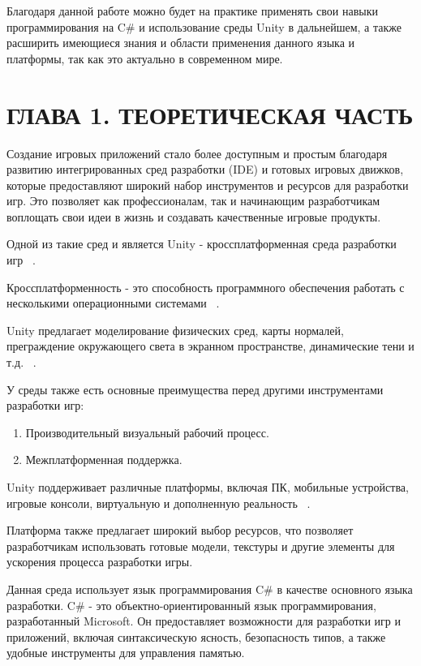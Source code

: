 \documentclass[14pt, oneside]{altsu-report}
\begin{document}
Благодаря данной работе можно будет на практике применять свои навыки программирования на C\# и использование среды Unity в дальнейшем, а также расширить имеющиеся знания и области применения данного языка и платформы, так как это актуально в современном мире.


\chapter{ГЛАВА 1. ТЕОРЕТИЧЕСКАЯ ЧАСТЬ} 

Создание игровых приложений стало более доступным и простым благодаря развитию интегрированных сред разработки (IDE) и готовых игровых движков, которые предоставляют широкий набор инструментов и ресурсов для разработки игр. Это позволяет как профессионалам, так и начинающим разработчикам воплощать свои идеи в жизнь и создавать качественные игровые продукты.

Одной из такие сред и является Unity - кроссплатформенная среда разработки игр ~\cite{Unity18}.  

Кроссплатформенность - это способность программного обеспечения работать с несколькими операционными системами ~\cite{Unity19}. 

Unity предлагает моделирование физических сред, карты нормалей, преграждение окружающего света в экранном пространстве, динамические тени и т.д.  ~\cite{Unity20}. 

У среды также есть основные преимущества перед другими инструментами разработки игр:

\begin{enumerate}
\item Производительный визуальный рабочий процесс.
\item Межплатформенная поддержка.
\end{enumerate} 

Unity поддерживает различные платформы, включая ПК, мобильные устройства, игровые консоли, виртуальную и дополненную реальность ~\cite{Unity, Unity2, Unity5}.

Платформа также предлагает широкий выбор ресурсов, что позволяет разработчикам использовать готовые модели, текстуры и другие элементы для ускорения процесса разработки игры. 

Данная среда использует язык программирования C\# в качестве основного языка разработки. C\# - это объектно-ориентированный язык программирования, разработанный Microsoft. Он предоставляет возможности для разработки игр и приложений, включая синтаксическую ясность, безопасность типов, а также удобные инструменты для управления памятью.
\end{document}
